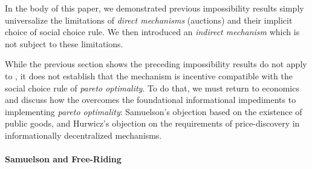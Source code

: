 
In the body of this paper, we demonstrated previous impossibility results simply universalize the limitations of \textit{direct mechanisms} (auctions) and their implicit choice of social choice rule. We then introduced an \textit{indirect mechanism} which is not subject to these limitations.

While the previous section shows the preceding impossibility results do not apply to \ourTFM, it does not establish that the mechanism is incentive compatible with the social choice rule of \textit{pareto optimality}. To do that, we must return to economics and discuss how the \ourTFM overcomes the foundational informational impediments to implementing \textit{pareto optimality}: Samuelson's objection based on the existence of public goods, and Hurwicz's objection on the requirements of price-discovery in informationally decentralized mechanisms.

\paragraph{Samuelson and Free-Riding}

